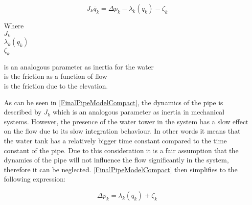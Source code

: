 \begin{equation}
\label{FinalPipeModelCompact}
   J_k \dot{q_k} = \Delta p_k - \lambda_k(q_k) - \zeta_k 
\end{equation}

 \begin{minipage}[t]{0.20\textwidth}
Where\\
\hspace*{8mm} $J_k$ \\
\hspace*{8mm} $\lambda_k(q_k)$ \\
\hspace*{8mm} $\zeta_k$ 
\end{minipage}
\begin{minipage}[t]{0.68\textwidth}
\vspace*{2mm}
is an analogous parameter as inertia for the water\\ 
is the friction as a function of flow\\
is the friction due to the elevation.
\end{minipage}

As can be seen in \eqref{FinalPipeModelCompact}, the dynamics of the pipe is described by $J_k$ which is an analogous parameter as inertia in mechanical systems. However, the presence of the water tower in the system has a slow effect on the flow due to its slow integration behaviour. In other words it means that the water tank has a relatively bigger time constant compared to the time constant of the pipe. Due to this consideration it is a fair assumption that the dynamics of the pipe will not influence the flow significantly in the system, therefore it can be neglected. \eqref{FinalPipeModelCompact} then simplifies to the following expression: 
  
\begin{equation}
\label{FinalPipeModelSimplified}
  \Delta p_k  =   \lambda_k(q_k) + \zeta_k 
\end{equation}


